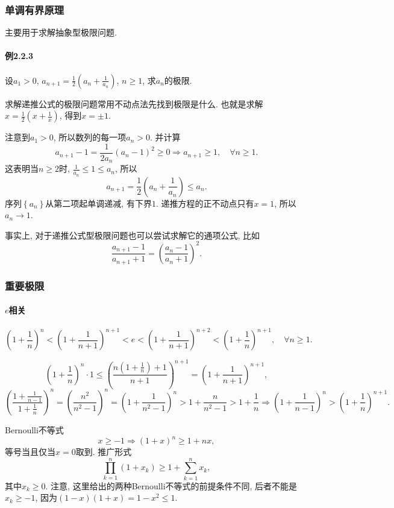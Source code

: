 \subsubsection{单调有界原理}

主要用于求解抽象型极限问题.

\paragraph{例2.2.3}

设$a_{1}>0$, $a_{n+1}=\frac{1}{2}\left(a_{n}+\frac{1}{a_{n}}\right)$,
$n\ge1$, 求$a_{n}$的极限.

求解递推公式的极限问题常用不动点法先找到极限是什么. 也就是求解$x=\frac{1}{2}\left(x+\frac{1}{x}\right)$,
得到$x=\pm1$.

注意到$a_{1}>0$, 所以数列的每一项$a_{n}>0$. 并计算
\[
a_{n+1}-1=\frac{1}{2a_{n}}(a_{n}-1)^{2}\ge0\Longrightarrow a_{n+1}\ge1,\quad\forall n\ge1.
\]
这表明当$n\ge2$时, $\frac{1}{a_{n}}\le1\le a_{n}$, 所以
\[
a_{n+1}=\frac{1}{2}\left(a_{n}+\frac{1}{a_{n}}\right)\le a_{n}.
\]
序列$\left\{ a_{n}\right\} $从第二项起单调递减, 有下界$1$. 递推方程的正不动点只有$x=1$,
所以$a_{n}\to1$.

事实上, 对于递推公式型极限问题也可以尝试求解它的通项公式, 比如
\[
\frac{a_{n+1}-1}{a_{n+1}+1}=\left(\frac{a_{n}-1}{a_{n}+1}\right)^{2}.
\]


\subsubsection{重要极限}

\paragraph{$e$相关}

\[
\left(1+\frac{1}{n}\right)^{n}<\left(1+\frac{1}{n+1}\right)^{n+1}<e<\left(1+\frac{1}{n+1}\right)^{n+2}<\left(1+\frac{1}{n}\right)^{n+1},\quad\forall n\ge1.
\]

\[
\left(1+\frac{1}{n}\right)^{n}\cdot1\le\left(\frac{n\left(1+\frac{1}{n}\right)+1}{n+1}\right)^{n+1}=\left(1+\frac{1}{n+1}\right)^{n+1},
\]
\[
\left(\frac{1+\frac{1}{n-1}}{1+\frac{1}{n}}\right)^{n}=\left(\frac{n^{2}}{n^{2}-1}\right)^{n}=\left(1+\frac{1}{n^{2}-1}\right)^{n}>1+\frac{n}{n^{2}-1}>1+\frac{1}{n}\Longrightarrow\left(1+\frac{1}{n-1}\right)^{n}>\left(1+\frac{1}{n}\right)^{n+1}.
\]

Bernoulli不等式
\[
x\ge-1\Longrightarrow(1+x)^{n}\ge1+nx,
\]
等号当且仅当$x=0$取到. 推广形式
\[
\prod_{k=1}^{n}\left(1+x_{k}\right)\ge1+\sum_{k=1}^{n}x_{k},
\]
其中$x_{k}\ge0$. 注意, 这里给出的两种Bernoulli不等式的前提条件不同, 后者不能是$x_{k}\ge-1$,
因为$(1-x)(1+x)=1-x^{2}\le1$.


